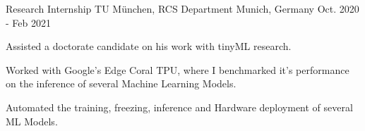 \begin{cventries}
  \cventry
    {Research Internship} %
    {TU München, RCS Department} %
    {Munich, Germany} %
    {Oct. 2020 - Feb 2021} %
    {
      \begin{cvitems} %
        \item {Assisted a doctorate candidate on his work with tinyML research.}
        \item {Worked with Google’s Edge Coral TPU, where I benchmarked it's
               performance on the inference of several Machine Learning Models.}
        \item {Automated the training, freezing, inference and Hardware deployment of several ML Models.}
      \end{cvitems}
    }


\end{cventries}
